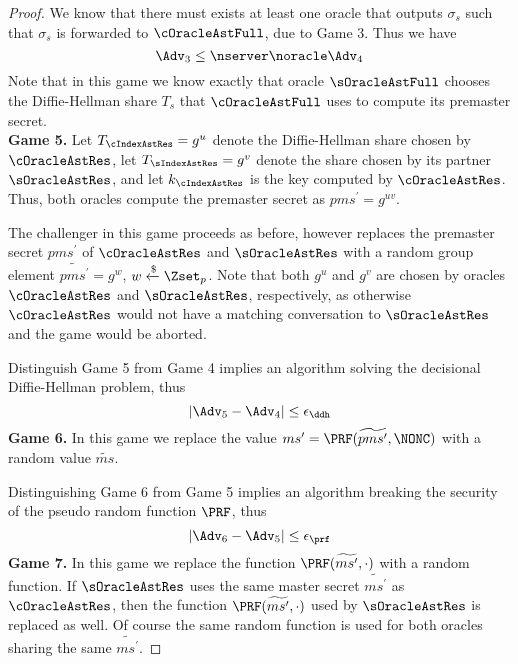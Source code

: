 \begin{proof}
 We know that there must exists at least one oracle that outputs $\sigma_s$ such that $\sigma_s$ is forwarded to $\cOracleAstFull$, due to Game 3. Thus we have
 \begin{equation}
  \Adv_3 \leq \nserver \noracle \Adv_4
 \end{equation}%
 Note that in this game we know exactly that oracle $\sOracleAstFull$ chooses the Diffie-Hellman share $T_s$ that $\cOracleAstFull$ uses to compute its premaster secret.
 \vspace{10pt}\\
%
%
 \textbf{Game 5.} Let $T_{\cIndexAstRes} = g^u$ denote the Diffie-Hellman share chosen by $\cOracleAstRes$, let $T_{\sIndexAstRes} = g^v$ denote the share chosen by its partner $\sOracleAstRes$, and let $k_{\cIndexAstRes}$ is the key computed by $\cOracleAstRes$. Thus, both oracles compute the premaster secret as $pms^{\prime} = g^{uv}$.

 The challenger in this game proceeds as before, however replaces the premaster secret $pms^{\prime}$ of $\cOracleAstRes$ and $\sOracleAstRes$ with a random group element $\widetilde{pms^{\prime}} = g^w$, $w \xleftarrow{\$} \Zset_p$. Note that both $g^u$ and $g^v$ are chosen by oracles $\cOracleAstRes$ and $\sOracleAstRes$, respectively, as otherwise $\cOracleAstRes$ would not have a matching conversation to $\sOracleAstRes$ and the game would be aborted.

 Distinguish Game 5 from Game 4 implies an algorithm solving the decisional Diffie-Hellman problem, thus
 \begin{equation}
  |\Adv_{5} - \Adv_{4}| \leq \epsilon_{\ddh}
 \end{equation}%
%
%
 \textbf{Game 6.} In this game we replace the value $ms^{\prime} = \PRF(\widetilde{pms^{\prime}}, \NONC)$ with a random value $\widetilde{ms}$.

 Distinguishing Game 6 from Game 5 implies an algorithm breaking the security of the pseudo random function $\PRF$, thus
 \begin{equation}
  |\Adv_{6} - \Adv_{5}| \leq \epsilon_{\prf}
 \end{equation}%
%
%
 \textbf{Game 7.} In this game we replace the function $\PRF(\widetilde{ms^{\prime}},\cdot)$ with a random function. If $\sOracleAstRes$ uses the same master secret $\widetilde{ms^{\prime}}$ as $\cOracleAstRes$, then the function $\PRF(\widetilde{ms^{\prime}},\cdot)$ used by $\sOracleAstRes$ is replaced as well. Of course the same random function is used for both oracles sharing the same $\widetilde{ms^{\prime}}$.


\end{proof}
